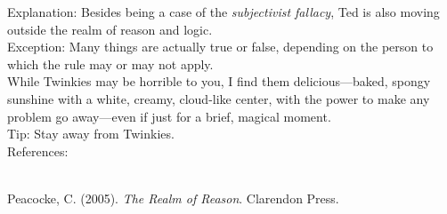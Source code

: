 \documentclass[a4paper,12pt,single,pdftex]{scrbook}
\begin{document}
    
      Explanation: Besides being a case of the {\it subjectivist fallacy}, Ted is also moving outside the realm of reason and logic.
    \\

    
      Exception: Many things are actually true or false, depending on the person to which the rule may or may not apply.
    \\

    
      While Twinkies may be horrible to you, I find them delicious—baked, spongy sunshine with a white, creamy, cloud-like center, with the power to make any problem go away—even if just for a brief, magical moment.
    \\

    
      Tip: Stay away from Twinkies.
    \\

    References:

    
      
        
      \\

      
        
          Peacocke, C. (2005). {\it The Realm of Reason}. Clarendon Press.
        
      
    
  
\end{document}
